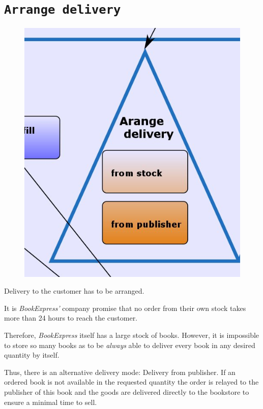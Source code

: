 \section{\texttt{Arrange delivery}}
\begin{figure}
\centering
\vspace{-20pt}
\includegraphics[scale=0.30]{./screenshots/Arange_delivery.jpeg}
\end{figure}

Delivery to the customer has to be arranged.

It is \emph{BookExpress'} company promise that no order from their own stock takes more than 24 hours to reach the customer.

Therefore, \emph{BookExpress} itself has a large stock of books. However, it is impossible to store so many books as to be \emph{always}
able to deliver every book in any desired quantity by itself.

Thus, there is an alternative delivery mode: Delivery from publisher. If an ordered book is not available in the requested quantity
the order is relayed to the publisher of this book and the goods are delivered directly to the bookstore to ensure a minimal time to sell.

